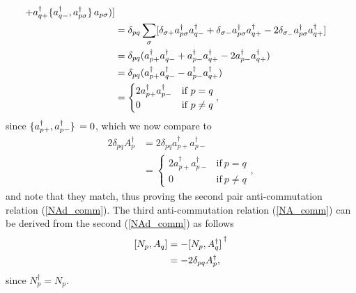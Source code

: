 \documentclass[10pt]{article}
\begin{document}
\begin{appendices}
\begin{align}
+
a^\dagger_{q+}\acomm*{a^\dagger_{q-}}{a^\dagger_{p\sigma}}a_{p\sigma}
)
]
\\
&=
\delta_{pq}\sum_\sigma 
[
\delta_{\sigma+}a^\dagger_{p\sigma}a^\dagger_{q-}
+
\delta_{\sigma-}a^\dagger_{p\sigma}a^\dagger_{q+}
-2
\delta_{\sigma_-}
a^\dagger_{p\sigma}a^\dagger_{q+}
]
\\
&=
\delta_{pq}
(
a^\dagger_{p+}a^\dagger_{q-}
+
a^\dagger_{p-}a^\dagger_{q+}
-2
a^\dagger_{p-}a^\dagger_{q+}
)
\\
&=
\delta_{pq}
(
a^\dagger_{p+}a^\dagger_{q-}
-
a^\dagger_{p-}a^\dagger_{q+}
)
\\
&=
\begin{cases}
2a^\dagger_{p+}a^\dagger_{p-} & \text{if} \ p=q
\\
0 & \text{if} \ p\neq q
\end{cases},
\end{align}
since $\acomm*{a^\dagger_{p+}}{a^\dagger_{p-}}=0$, which we now compare to
\begin{align}
2\delta_{pq}A^\dagger_p
&=
2\delta_{pq}a^\dagger_{p+}a^\dagger_{p-}
\\
&=
\begin{cases}
2a^\dagger_{p+}a^\dagger_{p-} & \text{if} \ p=q
\\
0 & \text{if} \ p\neq q
\end{cases},
\end{align}
and note that they match, thus proving the second pair anti-commutation relation (\ref{NAd_comm}). The third anti-commutation relation (\ref{NA_comm}) can be derived from the second (\ref{NAd_comm}) as follows
\begin{align}
\comm{N_p}{A_q}
&=
-\comm*{N_p}{A^\dagger_q}^\dagger
\\
&=
-2\delta_{pq}A^\dagger_p,
\end{align}
since $N_p^\dagger=N_p$. 

\end{appendices}

\backmatter
%
%
\makebibliographypage
%
\SingleSpacing
%

\printbibliography

\end{document}

